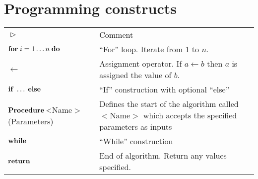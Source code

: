 \section*{Programming constructs}
\begin{tabular}{p{5.5cm} p{8cm}}
$\vartriangleright$		& Comment\\
${\bf for}\; i=1 \ldots n\; {\bf do}$ & ``For'' loop. Iterate from 1 to $n$.\\
$\gets$				& Assignment operator. If $a \gets b$ then $a$ is assigned the value of $b$.\\
$\bf{if} \;\ldots\; \bf{else}$		& ``If'' construction with optional ``else''\\
$\bf{Procedure}<${\sc Name}$>$(Parameters)		& Defines the start of the algorithm called $<${\sc Name}$>$ which accepts the specified parameters as inputs\\
$\bf{while}$			& ``While'' construction\\
$\bf{return}$			& End of algorithm. Return any values specified.
\end{tabular}
